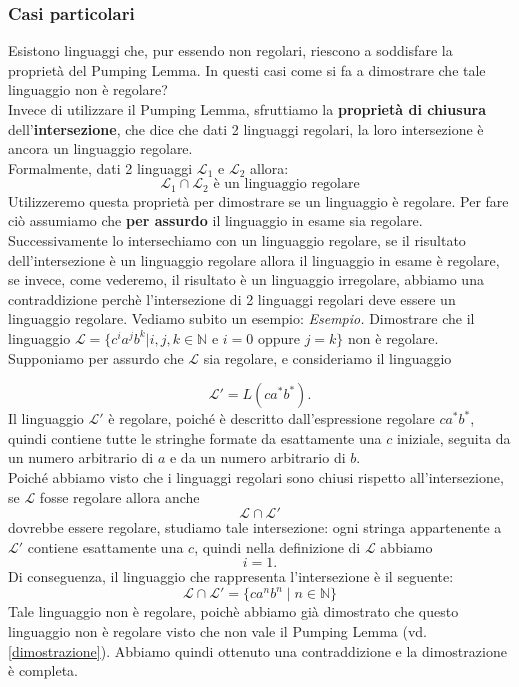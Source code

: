 \subsubsection{Casi particolari}
Esistono linguaggi che, pur essendo non regolari, riescono a soddisfare la proprietà del Pumping Lemma. In questi casi come si fa a dimostrare che tale linguaggio non è regolare?\\
Invece di utilizzare il Pumping Lemma, sfruttiamo la \textbf{proprietà di chiusura} dell'\textbf{intersezione}, che dice che dati 2 linguaggi regolari, la loro intersezione è ancora un linguaggio regolare.\\ 
Formalmente, dati 2 linguaggi $\mathcal{L}_1$ e $\mathcal{L}_2$ allora:
\[    \mathcal{L}_1 \cap \mathcal{L}_2 \text{ è un linguaggio regolare}   \]
Utilizzeremo questa proprietà per dimostrare se un linguaggio è regolare. Per fare ciò assumiamo che \textbf{per assurdo} il linguaggio in esame sia regolare. Successivamente lo intersechiamo con un linguaggio regolare, se il risultato
dell'intersezione è un linguaggio regolare allora il linguaggio in esame è regolare, se invece, come vederemo, il risultato è un linguaggio irregolare, abbiamo una contraddizione perchè l'intersezione di 2 linguaggi regolari 
deve essere un linguaggio regolare. Vediamo subito un esempio:
\newpage
\noindent \textit{Esempio.} Dimostrare che il linguaggio $\mathcal{L} = \{  c^i a^j b^k | i,j,k \in \mathbb{N} \text{ e } i = 0 \text{ oppure } j =k   \}$ non è regolare.\smallskip\\
Supponiamo per assurdo che $\mathcal{L}$ sia regolare, e consideriamo il linguaggio

\[\mathcal{L}' = L(ca^*b^*).\]
Il linguaggio $\mathcal{L}'$ è regolare, poiché è descritto dall'espressione regolare $ca^*b^*$, quindi contiene tutte le stringhe formate da esattamente una $c$ iniziale,
seguita da un numero arbitrario di $a$ e da un numero arbitrario di $b$.\\
Poiché abbiamo visto che i linguaggi regolari sono chiusi rispetto all'intersezione,
se $\mathcal{L}$ fosse regolare allora anche
\[\mathcal{L}\cap\mathcal{L}'\]
dovrebbe essere regolare, studiamo tale intersezione: ogni stringa appartenente a $\mathcal{L}'$ contiene esattamente una $c$,
quindi nella definizione di $\mathcal{L}$ abbiamo
\[i=1.\]
Di conseguenza, il linguaggio che rappresenta l'intersezione è il seguente:
\[\mathcal{L}\cap\mathcal{L}'=\{ca^n b^n \mid n\in\mathbb{N}\}\]
Tale linguaggio non è regolare, poichè abbiamo già dimostrato che questo linguaggio non è regolare visto che non vale il Pumping Lemma (vd. \ref{dimostrazione}).
Abbiamo quindi ottenuto una contraddizione e la dimostrazione è completa.











